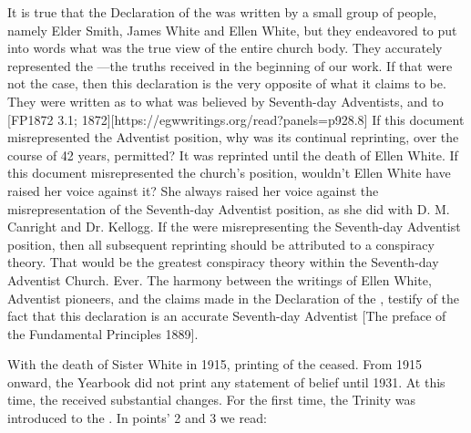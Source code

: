 It is true that the Declaration of the  was written by a small group of people, namely Elder Smith, James White and Ellen White, but they endeavored to put into words what was the true view of the entire church body. They accurately represented the —the truths received in the beginning of our work. If that were not the case, then this declaration is the very opposite of what it claims to be. They were written  as to what was believed by Seventh-day Adventists,  and to [FP1872 3.1; 1872][https://egwwritings.org/read?panels=p928.8] If this document misrepresented the Adventist position, why was its continual reprinting, over the course of 42 years, permitted? It was reprinted until the death of Ellen White. If this document misrepresented the church’s position, wouldn’t Ellen White have raised her voice against it? She always raised her voice against the misrepresentation of the Seventh-day Adventist position, as she did with D. M. Canright and Dr. Kellogg. If the  were misrepresenting the Seventh-day Adventist position, then all subsequent reprinting should be attributed to a conspiracy theory. That would be the greatest conspiracy theory within the Seventh-day Adventist Church. Ever. The harmony between the writings of Ellen White, Adventist pioneers, and the claims made in the Declaration of the , testify of the fact that this declaration is an accurate  Seventh-day Adventist [The preface of the Fundamental Principles 1889].

With the death of Sister White in 1915, printing of the  ceased. From 1915 onward, the Yearbook did not print any statement of belief until 1931. At this time, the  received substantial changes. For the first time, the Trinity was introduced to the . In points’ 2 and 3 we read:


